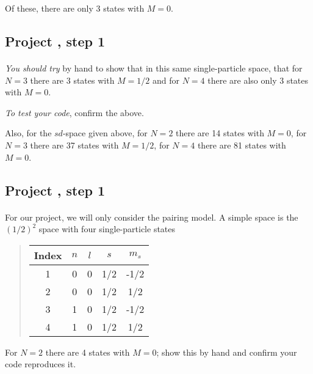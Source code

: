 \documentclass[%
twoside,                 %
final,                   %
10pt]{article}
\begin{document}
\noindent
Of these, there are only 3 states with $M=0$.



\subsection{Project , step 1}

\paragraph{}
\emph{You should try} by hand to show that in this same single-particle space, that for 
$N=3$ there are 3 states with $M=1/2$ and for $N= 4$ there are also only 3 states with $M=0$. 

\emph{To test your code}, confirm the above. 

Also, 
for the $sd$-space given above, for $N=2$ there are 14 states with $M=0$, for $N=3$ there are 37 
states with $M=1/2$, for $N=4$ there are 81 states with $M=0$.



\subsection{Project , step 1}

\paragraph{}
For our project, we will only consider the pairing model.
A simple space is the $(1/2)^2$ space with four single-particle states


\begin{quote}
\begin{tabular}{ccccc}
\hline
\multicolumn{1}{c}{ Index } & \multicolumn{1}{c}{ $n$ } & \multicolumn{1}{c}{ $l$ } & \multicolumn{1}{c}{ $s$ } & \multicolumn{1}{c}{ $m_s$ } \\
\hline
1     & 0   & 0   & 1/2 & -1/2  \\
2     & 0   & 0   & 1/2 & 1/2   \\
3     & 1   & 0   & 1/2 & -1/2  \\
4     & 1   & 0   & 1/2 & 1/2   \\
\hline
\end{tabular}
\end{quote}

\noindent
For $N=2$ there are 4 states with $M=0$; show this by hand and confirm your code reproduces it.
\end{document}
